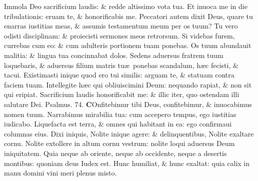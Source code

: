\documentclass[a5paper,10pt]{book}
\def\ae{æ}
\begin{document}
\begin{multicols*}{2}
\newline \color{red} I\color{black}mmola Deo sacrificium laudis: \& redde altissimo vota tua.
\newline \color{red} E\color{black}t inuoca me in die tribulationis: eruam te, \& honorificabis me.
\newline \color{red} P\color{black}eccatori autem dixit Deus, quare tu enarras iustitias meas, \& assumis testamentum meum per os tuum?
\newline \color{red} T\color{black}u vero odisti disciplinam: \& proiecisti sermones meos retrorsum.
\newline \color{red} S\color{black}i videbas furem, currebas cum eo: \& cum adulteris portionem tuam ponebas.
\newline \color{red} O\color{black}s tuum abundauit malitia: \& lingua tua concinnabat dolos.
\newline \color{red} S\color{black}edens aduersus fratrem tuum loquebaris, \& aduersus filium matris tu\ae \ ponebas scandalum, h\ae c fecisti, \& tacui.
\newline \color{red} E\color{black}xistimasti inique quod ero tui similis: arguam te, \& statuam contra faciem tuam.
\newline \color{red} I\color{black}ntellegite h\ae c qui obliuiscimini Deum: nequando rapiat, \& non sit qui eripiat.
\newline \color{red} S\color{black}acrificium laudis honorificabit me: \& illic iter, quo ostendam illi salutare Dei.
\newline \color{red} Psalmus. 74. \color{black}
\vspace{-.5em}
\lettrine[lines=2]{\bfseries \color{red} C}{}Onfitebimur tibi Deus, confitebimur, \& inuocabimus nomen tuum.
\newline \color{red} N\color{black}arrabimus mirabilia tua: cum accepero tempus, ego iustitias iudicabo.
\newline \color{red} L\color{black}iquefacta est terra, \& omnes qui habitant in ea: ego confirmaui columnas eius.
\newline \color{red} D\color{black}ixi iniquis, Nolite inique agere: \& delinquentibus, Nolite exaltare cornu.
\newline \color{red} N\color{black}olite extollere in altum cornu vestrum: nolite loqui aduersus Deum iniquitatem.
\newline \color{red} Q\color{black}uia neque ab oriente, neque ab occidente, neque a desertis montibus: quoniam deus Iudex est.
\newline \color{red} H\color{black}unc humiliat, \& hunc exaltat: quia calix in manu domini vini meri plenus misto.

\end{multicols*}
\end{document}
